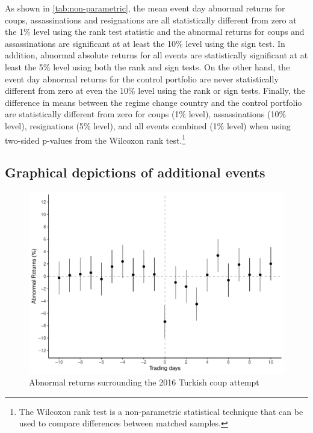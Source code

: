 \documentclass[12pt,final,fleqn]{article}
\theoremstyle{plain}
\begin{document}
As shown in \autoref{tab:non-parametric}, the mean event day abnormal returns for coups, assassinations and resignations are all statistically different from zero at the 1\% level using the rank test statistic and the abnormal returns for coups and assassinations are significant at at least the 10\% level using the sign test. In addition, abnormal absolute returns for all events are statistically significant at at least the 5\% level using both the rank and sign tests. On the other hand, the event day abnormal returns for the control portfolio are never statistically different from zero at even the 10\% level using the rank or sign tests. Finally, the difference in means between the regime change country and the control portfolio are statistically different from zero for coups (1\% level), assassinations (10\% level), resignations (5\% level), and all events combined (1\% level) when using two-sided p-values from the Wilcoxon rank test.\footnote{The Wilcoxon rank test is a non-parametric statistical technique that can be used to compare differences between matched samples.} 

\clearpage
\pagebreak

\subsection{Graphical depictions of additional events}



\begin{figure}[!htb]
\centering
\includegraphics[scale=0.75]{../figs/turkey_coup_attempt_2016.pdf}
\caption{Abnormal returns surrounding the 2016 Turkish coup attempt}
\label{fig:AR-Turkey-2016}
\end{figure}
\end{document}
